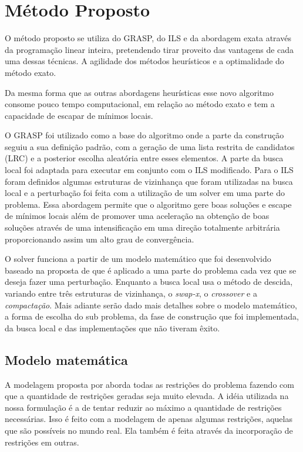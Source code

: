 \chapter{Método Proposto} \label{cap:metodoprop}
  
O método proposto se utiliza do GRASP, do ILS e da abordagem exata através da
programação linear inteira, pretendendo tirar proveito das vantagens de cada
uma dessas técnicas. A agilidade dos métodos heurísticos e a optimalidade do
método exato.
  
Da mesma forma que as outras abordagens heurísticas esse novo algoritmo
consome pouco tempo computacional, em relação ao método exato e tem a capacidade
de escapar de mínimos locais.
  
O GRASP foi utilizado como a base do algoritmo onde a parte da construção
seguiu a sua definição padrão, com a geração de uma lista restrita de candidatos
(LRC) e a posterior escolha aleatória entre esses elementos. A parte da busca
local foi adaptada para executar em conjunto com o ILS modificado. Para o ILS
foram definidos algumas estruturas de vizinhança que foram utilizadas
na busca local e a perturbação foi feita com a utilização de um solver em uma
parte do problema. Essa abordagem permite que o algoritmo gere boas
soluções e escape de mínimos locais além de promover uma aceleração na obtenção
de boas soluções através de uma intensificação em uma direção totalmente
arbitrária proporcionando assim um alto grau de convergência.


O solver funciona a partir de um modelo matemático que foi desenvolvido baseado
na proposta de \cite{pontes2002} que é aplicado a uma parte do problema cada
vez que se deseja fazer uma perturbação. Enquanto a busca local usa o método de
descida, variando entre três estruturas de vizinhança, o \textit{swap-x}, o
\textit{crossover} e a \textit{compactação}. Mais adiante serão dado mais
detalhes sobre o modelo matemático, a forma de escolha do sub problema, da fase
de construção que foi implementada, da busca local e das implementações que não
tiveram êxito.

\section{Modelo matemática} \label{sec:modelomat}

   
A modelagem proposta por \cite{pontes2002} aborda todas as restrições do
problema fazendo com que a quantidade de restrições geradas seja muito elevada.
A idéia utilizada na nossa formulação é a de tentar reduzir ao máximo a
quantidade de restrições necessárias. Isso é feito com a modelagem de apenas
algumas restrições, aquelas que são possíveis no mundo real. Ela também
é feita através da incorporação de restrições em outras.

